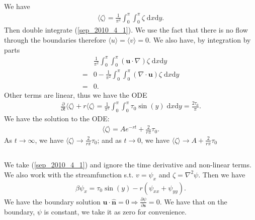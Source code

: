 \documentclass[11pt,letterpaper]{book}
\theoremstyle{definition}
\newcommand{\de}{\mathrm{d}}
\newcommand{\pe}{\partial}
\newcommand{\dsp}{\displaystyle}
\newcommand{\ve}[1]{\boldsymbol{#1}}
\begin{document}
\subsection{}
We have
\begin{align*}
\langle \zeta \rangle = \frac{1}{\pi^2}\int^\pi_0\int^\pi_0 \zeta \;\de x\de y.
\end{align*}
Then double integrate (\ref{sep_2010_4_1}). We use the fact that there is no flow through the boundaries therefore $\langle u \rangle=\langle v \rangle = 0$. We also have, by integration by parts
\begin{align*}
&\frac{1}{\pi^2}\int^\pi_0\int^\pi_0 (\ve u\cdot \nabla)\zeta \;\de x\de y\\
=& 0-\frac{1}{\pi^2}\int^\pi_0\int^\pi_0 (\nabla\cdot \ve u) \zeta \;\de x\de y\\
=& 0.
\end{align*}
Other terms are linear, thus we have the ODE
\begin{align*}
\frac{\pe}{\pe t}\langle \zeta \rangle+r\langle \zeta \rangle = \frac{1}{\pi^2}\int^\pi_0\int^\pi_0 \tau_0\sin(y) \;\de x\de y = \frac{2\tau_0}{\pi}.
\end{align*}
We have the solution to the ODE:
\begin{align*}
\langle \zeta \rangle = Ae^{-rt}+\frac{2}{r\pi}\tau_0.
\end{align*}
As $t\to\infty$, we have $\langle \zeta \rangle \to \dsp{\frac{2}{r\pi}\tau_0}$; and as $t\to0$, we have $\langle \zeta \rangle \to \dsp{A+\frac{2}{r\pi}\tau_0}$

\subsection{}
We take (\ref{sep_2010_4_1}) and ignore the time derivative and non-linear terms. We also work with the streamfunction s.t. $v = \psi_x$ and $\zeta = \nabla^2\psi$. Then we have
\begin{align}
\beta\psi_x = \tau_0\sin(y)-r(\psi_{xx}+\psi_{yy}).\label{sep_2010_4_2}
\end{align}
We have the boundary solution $\ve u\cdot\ve{\hat n} = 0\Rightarrow \dsp{\frac{\pe \psi}{\pe \ve s} = 0}$. We have that on the boundary, $\psi$ is constant, we take it as zero for convenience. 
\end{document}
